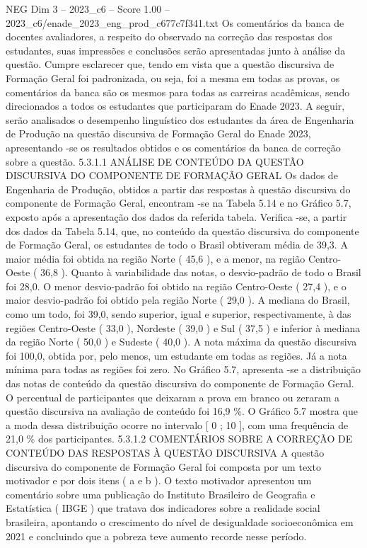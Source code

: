 \begin{textsample}{NEG Dim 3 – 2023\_c6 – Score 1.00 – 2023\_c6/enade\_2023\_eng\_prod\_c677c7f341.txt}
Os comentários da banca de docentes avaliadores, a respeito do observado na correção das respostas dos estudantes, suas impressões e conclusões serão apresentadas junto à análise da questão.
Cumpre esclarecer que, tendo em vista que a questão discursiva de Formação Geral foi padronizada, ou seja, foi a mesma em todas as provas, os comentários da banca são os mesmos para todas as carreiras acadêmicas, sendo direcionados a todos os estudantes que participaram do Enade 2023.
A seguir, serão analisados o desempenho linguístico dos estudantes da área de Engenharia de Produção na questão discursiva de Formação Geral do Enade 2023, apresentando -se os resultados obtidos e os comentários da banca de correção sobre a questão. 5.3.1.1 ANÁLISE DE CONTEÚDO DA QUESTÃO DISCURSIVA DO COMPONENTE DE FORMAÇÃO GERAL Os dados de Engenharia de Produção, obtidos a partir das respostas à questão discursiva do componente de Formação Geral, encontram -se na Tabela 5.14 e no Gráfico 5.7, exposto após a apresentação dos dados da referida tabela.
Verifica -se, a partir dos dados da Tabela 5.14, que, no conteúdo da questão discursiva do componente de Formação Geral, os estudantes de todo o Brasil obtiveram média de 39,3.
A maior média foi obtida na região Norte ( 45,6 ), e a menor, na região Centro-Oeste ( 36,8 ).
Quanto à variabilidade das notas, o desvio-padrão de todo o Brasil foi 28,0.
O menor desvio-padrão foi obtido na região Centro-Oeste ( 27,4 ), e o maior desvio-padrão foi obtido pela região Norte ( 29,0 ).
A mediana do Brasil, como um todo, foi 39,0, sendo superior, igual e superior, respectivamente, à das regiões Centro-Oeste ( 33,0 ), Nordeste ( 39,0 ) e Sul ( 37,5 ) e inferior à mediana da região Norte ( 50,0 ) e Sudeste ( 40,0 ).
A nota máxima da questão discursiva foi 100,0, obtida por, pelo menos, um estudante em todas as regiões.
Já a nota mínima para todas as regiões foi zero.
No Gráfico 5.7, apresenta -se a distribuição das notas de conteúdo da questão discursiva do componente de Formação Geral.
O percentual de participantes que deixaram a prova em branco ou zeraram a questão discursiva na avaliação de conteúdo foi 16,9 \%.
O Gráfico 5.7 mostra que a moda dessa distribuição ocorre no intervalo [ 0 ; 10 ], com uma frequência de 21,0 \% dos participantes. 5.3.1.2 COMENTÁRIOS SOBRE A CORREÇÃO DE CONTEÚDO DAS RESPOSTAS À QUESTÃO DISCURSIVA A questão discursiva do componente de Formação Geral foi composta por um texto motivador e por dois itens ( a e b ).
O texto motivador apresentou um comentário sobre uma publicação do Instituto Brasileiro de Geografia e Estatística ( IBGE ) que tratava dos indicadores sobre a realidade social brasileira, apontando o crescimento do nível de desigualdade socioeconômica em 2021 e concluindo que a pobreza teve aumento recorde nesse período.

\end{textsample}
